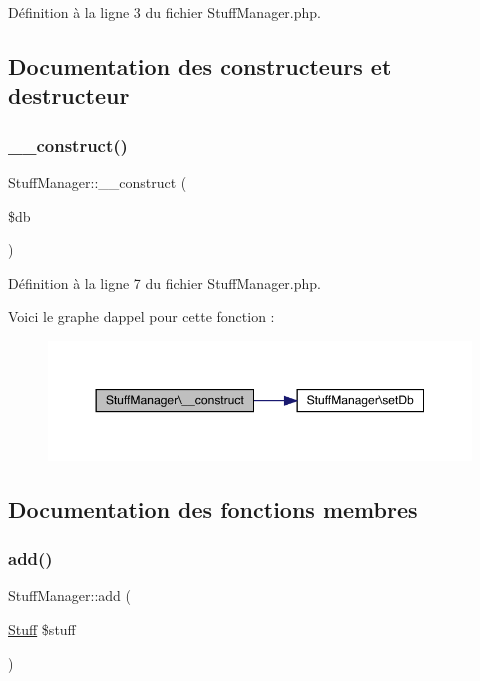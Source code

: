 Définition à la ligne 3 du fichier Stuff\+Manager.\+php.



\subsection{Documentation des constructeurs et destructeur}
\mbox{\label{class_stuff_manager_af5fbc1b8f8a8c6cb0463af793f97c807}} 
\subsubsection{\texorpdfstring{\+\_\+\+\_\+construct()}{\_\_construct()}}
{\footnotesize\ttfamily Stuff\+Manager\+::\+\_\+\+\_\+construct (\begin{DoxyParamCaption}\item[{}]{\$db }\end{DoxyParamCaption})}



Définition à la ligne 7 du fichier Stuff\+Manager.\+php.

Voici le graphe d\textquotesingle{}appel pour cette fonction \+:\nopagebreak
\begin{figure}[H]
\begin{center}
\leavevmode
\includegraphics[width=350pt]{class_stuff_manager_af5fbc1b8f8a8c6cb0463af793f97c807_cgraph}
\end{center}
\end{figure}


\subsection{Documentation des fonctions membres}
\mbox{\label{class_stuff_manager_ab754f0d8b6625898735779a852268223}} 
\subsubsection{\texorpdfstring{add()}{add()}}
{\footnotesize\ttfamily Stuff\+Manager\+::add (\begin{DoxyParamCaption}\item[{\mbox{\hyperlink{class_stuff}{Stuff}}}]{\$stuff }\end{DoxyParamCaption})}



